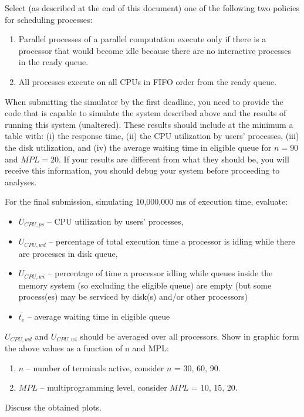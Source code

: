 \documentclass[12pt,letterpaper]{article}
\begin{document}
Select (as described at the end of this document) one of the following two policies for
scheduling processes:
\begin{enumerate}
\item Parallel processes of a parallel computation execute only if there is a processor that
would become idle because there are no interactive processes in the ready queue.
\item All processes execute on all CPUs in FIFO order from the ready queue.
\end{enumerate}
When submitting the simulator by the first deadline, you need to provide the code
that is capable to simulate the system described above and the results of running this
system (unaltered). These results should include at the minimum a table with: (i) the
response time, (ii) the CPU utilization by users' processes, (iii) the disk utilization, and
(iv) the average waiting time in eligible queue for $n = 90$ and $MPL = 20$. If your results
are different from what they should be, you will receive this information, you should debug
your system before proceeding to analyses.

For the final submission, simulating 10,000,000 ms of execution time, evaluate:
\begin{itemize}
\item $U_{CPU,ps}$ -- CPU utilization by users' processes,
\item $U_{CPU,wd}$ -- percentage of total execution time a processor is idling while there are
processes in disk queue,
\item $U_{CPU,wi}$ -- percentage of time a processor idling while queues inside the memory
system (so excluding the eligible queue) are empty (but some process(es) may be
serviced by disk(s) and/or other processors)
\item $\overline{t_e}$ -- average waiting time in eligible queue
\end{itemize}
$U_{CPU,wd}$ and $U_{CPU,wi}$ should be averaged over all processors.
Show in graphic form the above values as a function of n and MPL:
\begin{enumerate}
\item $n$ -- number of terminals active, consider $n$ = 30, 60, 90.
\item $MPL$ -- multiprogramming level, consider $MPL$ = 10, 15, 20.
\end{enumerate}
Discuss the obtained plots.
\end{document}
